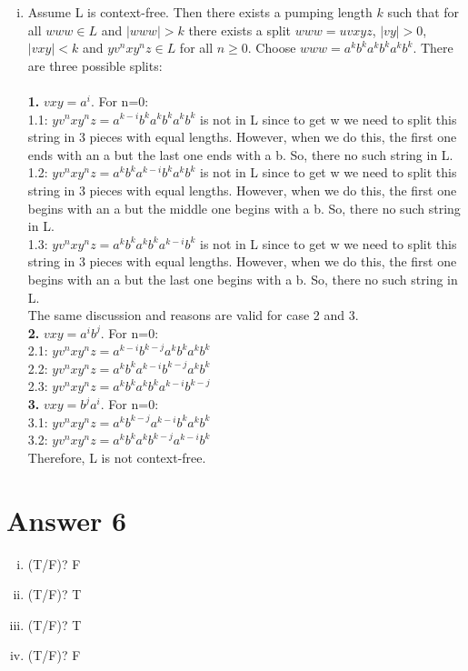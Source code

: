 \documentclass[12pt]{article}
\begin{document}
\begin{enumerate}[(i)]
\item 
Assume L is context-free. Then there exists a pumping length $k$ such that for all $www\in L$ and $|www|>k$ there exists a split $www=uvxyz$, $|vy|>0$, $|vxy|<k$ and $yv^nxy^nz\in L$ for all $n\geq 0$. Choose $www=a^kb^ka^kb^ka^kb^k$. There are three possible splits:\\\\
\textbf{1.} $vxy=a^i$. For n=0:\\
1.1: $yv^nxy^nz=a^{k-i}b^ka^kb^ka^kb^k$ is not in L since to get w we need to split this string in 3 pieces with equal lengths. However, when we do this, the first one ends with an a but the last one ends with a b. So, there no such string in L.\\
1.2: $yv^nxy^nz=a^kb^ka^{k-i}b^ka^kb^k$ is not in L since to get w we need to split this string in 3 pieces with equal lengths. However, when we do this, the first one begins with an a but the middle one begins with a b. So, there no such string in L.\\
1.3: $yv^nxy^nz=a^kb^ka^kb^ka^{k-i}b^k$ is not in L since to get w we need to split this string in 3 pieces with equal lengths. However, when we do this, the first one begins with an a but the last one begins with a b. So, there no such string in L.\\ 
The same discussion and reasons are valid for case 2 and 3.\\
\textbf{2.} $vxy=a^ib^j$. For n=0:\\
2.1: $yv^nxy^nz=a^{k-i}b^{k-j}a^kb^ka^kb^k$\\
2.2: $yv^nxy^nz=a^kb^ka^{k-i}b^{k-j}a^kb^k$\\
2.3: $yv^nxy^nz=a^kb^ka^kb^ka^{k-i}b^{k-j}$\\
\textbf{3.} $vxy=b^ja^i$. For n=0:\\
3.1: $yv^nxy^nz=a^kb^{k-j}a^{k-i}b^ka^kb^k$\\
3.2: $yv^nxy^nz=a^kb^ka^kb^{k-j}a^{k-i}b^k$\\
Therefore, L is not context-free.

\end{enumerate}


\section*{Answer 6}
\begin{enumerate}[(i)]
\item (T/F)? F
\item (T/F)? T
\item (T/F)? T
\item (T/F)? F
\end{enumerate}

\end{document}
